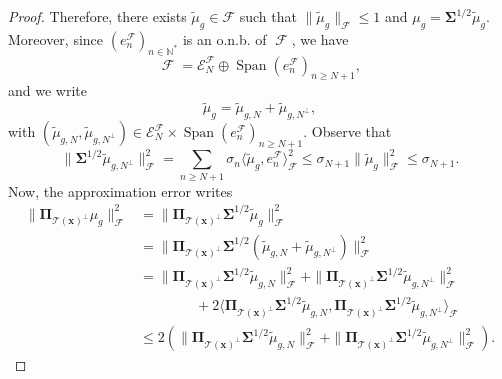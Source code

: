 \documentclass[twoside,11pt]{book}
\numberwithin{theorem}{chapter}
\numberwithin{definition}{chapter}
\numberwithin{proposition}{chapter}
\numberwithin{corollary}{chapter}
\numberwithin{example}{chapter}
\numberwithin{lemma}{chapter}
\numberwithin{assumption}{chapter}
\numberwithin{equation}{chapter}
\numberwithin{figure}{chapter}
\DeclareMathOperator{\Span}{\mathrm{Span}}
\DeclareMathOperator{\F}{\mathcal{F}}
\begin{document}
\begin{proof}
Therefore, there exists $\tilde{\mu}_{g} \in \mathcal{F}$ such that $\|\tilde{\mu}_{g}\|_{\mathcal{F}} \leq 1$ and $\mu_{g} = \bm{\Sigma}^{1/2}\tilde{\mu}_{g}$. Moreover,
since $(e_{n}^{\F})_{n \in \mathbb{N}^{*}}$ is an o.n.b. of $\F$, we have
\begin{equation}
\F = \mathcal{E}_{N}^{\F} \oplus \Span (e_{n}^{\F})_{n \geq N+1},
\end{equation}
and we write
\begin{equation}
\tilde{\mu}_{g} = \tilde{\mu}_{g,N} + \tilde{\mu}_{g,N^{\perp}},
\end{equation}
with $(\tilde{\mu}_{g,N}, \tilde{\mu}_{g,N^{\perp}}) \in \mathcal{E}_{N}^{\F} \times \Span (e_{n}^{\F})_{n \geq N+1}$. Observe that
\begin{equation}\label{eq:sup_sigma_N}
  \|\bm{\Sigma}^{1/2} \tilde{\mu}_{g,N^{\perp}}\|_{\mathcal{F}}^{2} = \sum\limits_{n \geq N+1} \sigma_{n} \langle \tilde{\mu}_{g},e_{n}^{\F} \rangle_{\F}^{2}  \leq \sigma_{N+1} \|\tilde{\mu}_{g}\|_{\F}^{2} \leq \sigma_{N+1}.
\end{equation}
 Now, the approximation error writes
\begin{align}
  \|\bm{\Pi}_{\mathcal{T}(\bm{x})^{\perp}}\mu_{g}\|^{2}_{\mathcal{F}}& = \| \bm{\Pi}_{\mathcal{T}(\bm{x})^{\perp}}\bm{\Sigma}^{1/2} \tilde{\mu}_{g}\| _{\mathcal{F}}^{2}\\
  & = \| \bm{\Pi}_{\mathcal{T}(\bm{x})^{\perp}}\bm{\Sigma}^{1/2}(\tilde{\mu}_{g,N} + \tilde{\mu}_{g,N^{\perp}}) \| _{\mathcal{F}}^{2} \nonumber\\
  & = \| \bm{\Pi}_{\mathcal{T}(\bm{x})^{\perp}}\bm{\Sigma}^{1/2} \tilde{\mu}_{g,N}\|_{\mathcal{F}}^{2} + \| \bm{\Pi}_{\mathcal{T}(\bm{x})^{\perp}}\bm{\Sigma}^{1/2} \tilde{\mu}_{g,N^{\perp}}\| _{\mathcal{F}}^{2} \\
  & \qquad\qquad + 2 \langle \bm{\Pi}_{\mathcal{T}(\bm{x})^{\perp}}\bm{\Sigma}^{1/2} \tilde{\mu}_{g,N}, \bm{\Pi}_{\mathcal{T}(\bm{x})^{\perp}}\bm{\Sigma}^{1/2} \tilde{\mu}_{g,N^{\perp}}\rangle_{\mathcal{F}} \nonumber\\
  & \leq 2 \left(\| \bm{\Pi}_{\mathcal{T}(\bm{x})^{\perp}}\bm{\Sigma}^{1/2}\tilde{\mu}_{g,N}\| _{\mathcal{F}}^{2} + \| \bm{\Pi}_{\mathcal{T}(\bm{x})^{\perp}}\bm{\Sigma}^{1/2} \tilde{\mu}_{g,N^{\perp}}\| _{\mathcal{F}}^{2}\right) \nonumber.

\end{align}
\end{proof}
\end{document}
